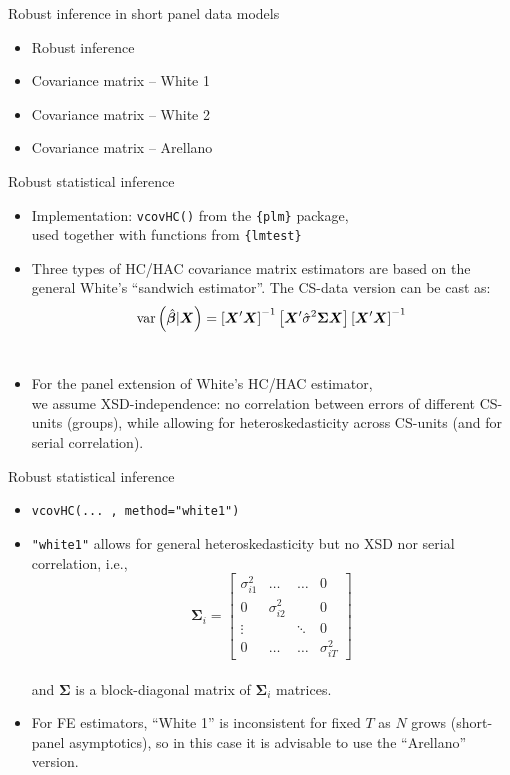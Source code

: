 \documentclass[usenames,dvipsnames]{beamer}
\begin{document}
\begin{frame}{Robust inference in short panel data models}
\begin{itemize}
    \item Robust inference
    \bigskip
    \item Covariance matrix -- White 1 
    \bigskip
    \item Covariance matrix -- White 2
    \bigskip
    \item Covariance matrix -- Arellano
\end{itemize}
\end{frame}
\begin{frame}{Robust statistical inference}
\begin{itemize}
    \item Implementation: \texttt{vcovHC()} from the \texttt{\{plm\}} package, 
    \\used together with functions from \texttt{\{lmtest\}}
    \medskip
    \item Three types of HC/HAC covariance matrix estimators are based on the general White's ``sandwich estimator''. The CS-data version can be cast as:\\
    \medskip
    $$\textnormal{var} \left(\hat{\bm{\beta}}|\bm{X}\right)= 
    \left[ \bm{X}^{\prime} \bm{X} \right]^{-1}
    \left[ \bm{X}^{\prime} \hat{\sigma}^2 \bm{\Sigma} \bm{X} \right]
    \left[ \bm{X}^{\prime} \bm{X} \right]^{-1}$$ \\ \medskip
     \medskip
    \item For the panel extension of White's HC/HAC estimator, \\we assume XSD-independence: no correlation between errors of different CS-units (groups), while allowing for heteroskedasticity across CS-units (and for serial correlation).
\end{itemize}
\end{frame}
\begin{frame}{Robust statistical inference}
\begin{itemize}
    \item \texttt{vcovHC(... , method="white1")}
    \medskip
    \item \texttt{"white1"} allows for general heteroskedasticity but no XSD nor serial correlation, i.e.,\\
    $$
    \bm{\Sigma}_i =
    \begin{bmatrix}
    \sigma_{i1}^2 & \dots & \dots & 0 \\
    0 & \sigma_{i2}^2 &  & 0 \\
    \vdots & & \ddots & 0 \\
    0 & \dots & \dots & \sigma_{iT}^2
    \end{bmatrix}
    $$\\
    and $\bm{\Sigma}$ is a block-diagonal matrix of $\bm{\Sigma}_i$ matrices.
    \smallskip
    \medskip
    \item For FE estimators, ``White 1'' is inconsistent for fixed $T$ as $N$ grows (short-panel asymptotics), so in this case it is advisable to use the ``Arellano'' version.
\end{itemize}
\end{frame}
\end{document}
